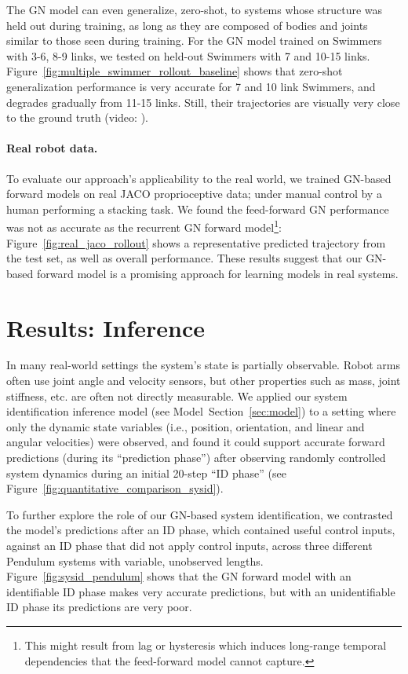 \documentclass{article}
\begin{document}
The GN model can even generalize, zero-shot, to systems whose structure was held out during training, as long as they are composed of bodies and joints similar to those seen during training. For the GN model trained on Swimmers with 3-6, 8-9 links, we tested on held-out Swimmers with 7 and 10-15 links. Figure~\ref{fig:multiple_swimmer_rollout_baseline} shows that zero-shot generalization performance is very accurate for 7 and 10 link Swimmers, and degrades gradually from 11-15 links. Still, their trajectories are visually very close to the ground truth (video:  \href{\rolloutsmultipleswimmerzeroshot}{\rolloutsmultipleswimmerzeroshotname}).

\paragraph{Real robot data.}
To evaluate our approach's applicability to the real world, we trained GN-based forward models on real JACO proprioceptive data; under manual control by a human performing a stacking task.
%
We found the feed-forward GN performance was not as accurate as the recurrent GN forward model\footnote{This might result from lag or hysteresis which induces long-range temporal dependencies that the feed-forward model cannot capture.}: Figure~\ref{fig:real_jaco_rollout} shows a representative predicted trajectory from the test set, as well as overall performance. These results suggest that our GN-based forward model is a promising approach for learning models in real systems.




\section{Results: Inference}
In many real-world settings the system's state is partially observable. Robot arms often use joint angle and velocity sensors, but other properties such as mass, joint stiffness, etc. are often not directly measurable. 
% 
We applied our system identification inference model (see Model~Section~\ref{sec:model}) to a setting where only the dynamic state variables (i.e., position, orientation, and linear and angular velocities) were observed, and found it could support accurate forward predictions (during its ``prediction phase'') after observing randomly controlled system dynamics during an initial 20-step ``ID phase'' (see Figure~\ref{fig:quantitative_comparison_sysid}).

To further explore the role of our GN-based system identification, we contrasted the model's predictions after an ID phase, which contained useful control inputs, against an ID phase that did not apply control inputs, across three different Pendulum systems with variable, unobserved lengths.
Figure~\ref{fig:sysid_pendulum} shows that the GN forward model with an identifiable ID phase makes very accurate predictions, but with an unidentifiable ID phase its predictions are very poor. 
\end{document}
